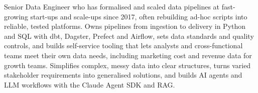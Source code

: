 
\begin{cvparagraph}

Senior Data Engineer who has formalised and scaled data pipelines at fast-growing start-ups and scale-ups since 2017, often rebuilding ad-hoc scripts into reliable, tested platforms. Owns pipelines from ingestion to delivery in Python and SQL with dbt, Dagster, Prefect and Airflow, sets data standards and quality controls, and builds self-service tooling that lets analysts and cross-functional teams meet their own data needs, including marketing cost and revenue data for growth teams. Simplifies complex, messy data into clear structures, turns varied stakeholder requirements into generalised solutions, and builds AI agents and LLM workflows with the Claude Agent SDK and RAG.

\end{cvparagraph}
